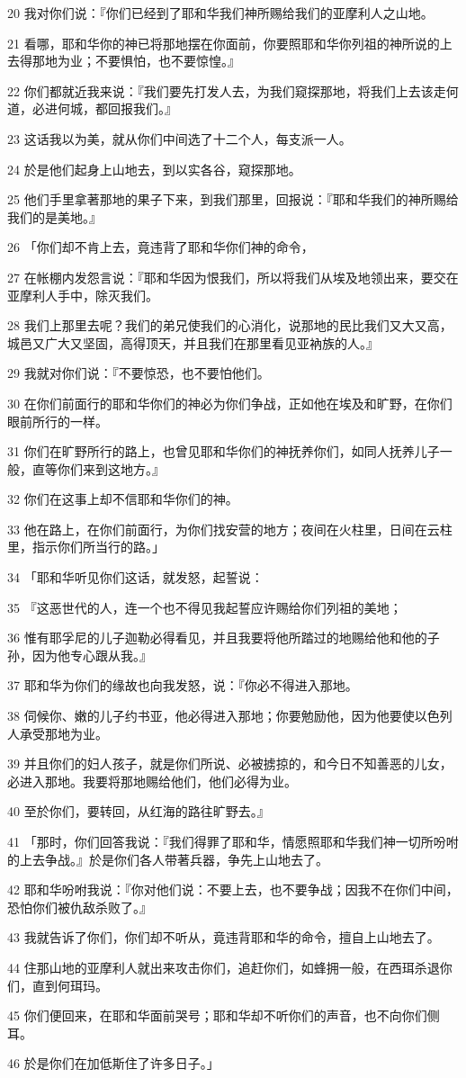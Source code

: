 \par 20 我对你们说：『你们已经到了耶和华我们神所赐给我们的亚摩利人之山地。
\par 21 看哪，耶和华你的神已将那地摆在你面前，你要照耶和华你列祖的神所说的上去得那地为业；不要惧怕，也不要惊惶。』
\par 22 你们都就近我来说：『我们要先打发人去，为我们窥探那地，将我们上去该走何道，必进何城，都回报我们。』
\par 23 这话我以为美，就从你们中间选了十二个人，每支派一人。
\par 24 於是他们起身上山地去，到以实各谷，窥探那地。
\par 25 他们手里拿著那地的果子下来，到我们那里，回报说：『耶和华我们的神所赐给我们的是美地。』
\par 26 「你们却不肯上去，竟违背了耶和华你们神的命令，
\par 27 在帐棚内发怨言说：『耶和华因为恨我们，所以将我们从埃及地领出来，要交在亚摩利人手中，除灭我们。
\par 28 我们上那里去呢？我们的弟兄使我们的心消化，说那地的民比我们又大又高，城邑又广大又坚固，高得顶天，并且我们在那里看见亚衲族的人。』
\par 29 我就对你们说：『不要惊恐，也不要怕他们。
\par 30 在你们前面行的耶和华你们的神必为你们争战，正如他在埃及和旷野，在你们眼前所行的一样。
\par 31 你们在旷野所行的路上，也曾见耶和华你们的神抚养你们，如同人抚养儿子一般，直等你们来到这地方。』
\par 32 你们在这事上却不信耶和华你们的神。
\par 33 他在路上，在你们前面行，为你们找安营的地方；夜间在火柱里，日间在云柱里，指示你们所当行的路。」
\par 34 「耶和华听见你们这话，就发怒，起誓说：
\par 35 『这恶世代的人，连一个也不得见我起誓应许赐给你们列祖的美地；
\par 36 惟有耶孚尼的儿子迦勒必得看见，并且我要将他所踏过的地赐给他和他的子孙，因为他专心跟从我。』
\par 37 耶和华为你们的缘故也向我发怒，说：『你必不得进入那地。
\par 38 伺候你、嫩的儿子约书亚，他必得进入那地；你要勉励他，因为他要使以色列人承受那地为业。
\par 39 并且你们的妇人孩子，就是你们所说、必被掳掠的，和今日不知善恶的儿女，必进入那地。我要将那地赐给他们，他们必得为业。
\par 40 至於你们，要转回，从红海的路往旷野去。』
\par 41 「那时，你们回答我说：『我们得罪了耶和华，情愿照耶和华我们神一切所吩咐的上去争战。』於是你们各人带著兵器，争先上山地去了。
\par 42 耶和华吩咐我说：『你对他们说：不要上去，也不要争战；因我不在你们中间，恐怕你们被仇敌杀败了。』
\par 43 我就告诉了你们，你们却不听从，竟违背耶和华的命令，擅自上山地去了。
\par 44 住那山地的亚摩利人就出来攻击你们，追赶你们，如蜂拥一般，在西珥杀退你们，直到何珥玛。
\par 45 你们便回来，在耶和华面前哭号；耶和华却不听你们的声音，也不向你们侧耳。
\par 46 於是你们在加低斯住了许多日子。」

